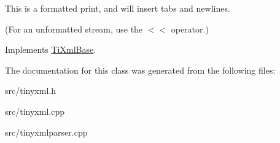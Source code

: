 This is a formatted print, and will insert tabs and newlines.

(For an unformatted stream, use the $<$$<$ operator.) 

Implements \hyperlink{classTiXmlBase_a0de56b3f2ef14c65091a3b916437b512}{Ti\+Xml\+Base}.



The documentation for this class was generated from the following files\+:\begin{DoxyCompactItemize}
\item 
src/tinyxml.\+h\item 
src/tinyxml.\+cpp\item 
src/tinyxmlparser.\+cpp\end{DoxyCompactItemize}
